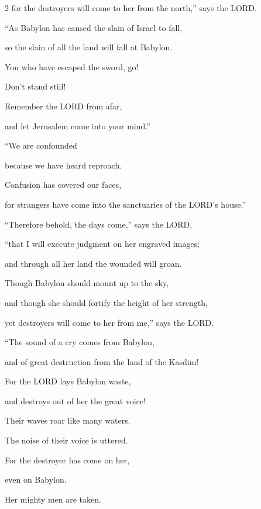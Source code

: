 \begin{multicols}{2}
for the destroyers will come to her from the north,” says the LORD.

\vspace{\baselineskip}

\myverse{}“As Babylon has caused the slain of Israel to fall,

so the slain of all the land will fall at Babylon.


\myverse{}You who have escaped the sword, go!

Don’t stand still!

Remember the LORD from afar,

and let Jerusalem come into your mind.”

\vspace{\baselineskip}

\myverse{}“We are confounded

because we have heard reproach.

Confusion has covered our faces,

for strangers have come into the sanctuaries of the LORD’s house.”

\vspace{\baselineskip}

\myverse{}“Therefore behold, the days come,” says the LORD,

“that I will execute judgment on her engraved images;

and through all her land the wounded will groan.


\myverse{}Though Babylon should mount up to the sky,

and though she should fortify the height of her strength,

yet destroyers will come to her from me,” says the LORD.

\vspace{\baselineskip}

\myverse{}“The sound of a cry comes from Babylon,

and of great destruction from the land of the Kasdim!


\myverse{}For the LORD lays Babylon waste,

and destroys out of her the great voice!

Their waves roar like many waters.

The noise of their voice is uttered.


\myverse{}For the destroyer has come on her,

even on Babylon.

Her mighty men are taken.


\end{multicols}
